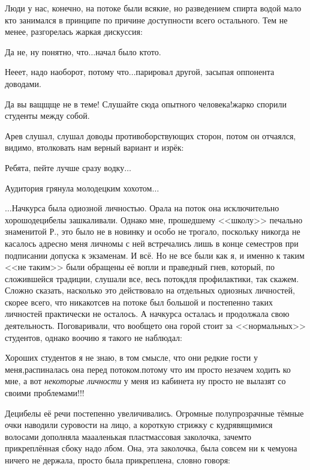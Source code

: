 Люди у нас, конечно, на потоке были всякие, но разведением спирта водой мало кто занимался в принципе по причине доступности всего остального. Тем не менее, разгорелась жаркая дискуссия:

\diagdash Да не, ну понятно, что$\ldots$\mdash начал было кто\sdash то.

\diagdash Не\sdash е\sdash ет, надо наоборот, потому что$\ldots$\mdash парировал другой, засыпая оппонента доводами.

\diagdash Да вы ващ\sdash щ\sdash ще не в теме! Слушайте сюда опытного человека!\mdash жарко спорили студенты между собой.

Ар\sdash ев слушал, слушал доводы противоборствующих сторон, потом он отчаялся, видимо, втолковать нам верный вариант и изрёк:

\diagdash Ребята, пейте лучше сразу водку$\ldots$

Аудитория грянула молодецким хохотом$\ldots$

\vspace{1.0cm}

$\ldots$Начкурса была одиозной личностью. Орала на поток она исключительно хорошо\mdash децибелы зашкаливали. Однако мне, прошедшему <<школу>> печально знаменитой Р., это было не в новинку и особо не трогало, поскольку никогда не касалось адресно меня лично\mdash мы с ней встречались лишь в конце семестров при подписании допуска к экзаменам. И всё. Но не все были как я, и именно к таким <<не таким>> были обращены её вопли и праведный гнев, который, по сложившейся традиции, слушали все, весь поток\mdash для профилактики, так скажем. Сложно сказать, насколько это действовало на отдельных одиозных личностей, скорее всего, что никак\mdash отсев на потоке был большой и постепенно таких личностей практически не осталось. А начкурса осталась и продолжала свою деятельность. Поговаривали, что вообще\sdash то она горой стоит за <<нормальных>> студентов, однако воочию я такого не наблюдал:

\diagdash Хороших студентов я не знаю, в том смысле, что они редкие гости у меня,\mdash распиналась она перед потоком.\mdash потому что им просто незачем ходить ко мне, а вот \textit{некоторые личности} у меня из кабинета ну просто не вылазят со своими проблемами!!!

Децибелы её речи постепенно увеличивались. Огромные полупрозрачные тёмные очки наводили суровости на лицо, а короткую стрижку с кудрявящимися волосами дополняла ма\sdash а\sdash аленькая пластмассовая заколочка, зачем\sdash то прикреплённая сбоку надо лбом. Она, эта заколочка, была совсем ни к чему\mdash она ничего не держала, просто была прикреплена, словно говоря:

